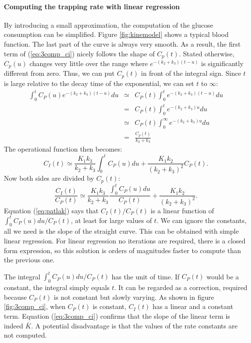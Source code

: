 \paragraph{Computing the trapping rate with linear regression\\}
By introducing a small approximation, the computation of the glucose
consumption can be simplified. Figure \ref{fig:kinemodel} shows a typical
blood function. The last part of the curve is always very smooth. As a result,
the first term of (\ref{eq:3comp_ci}) nicely follows the shape of
$C_p(t)$. Stated otherwise, $C_p(u)$ changes very little over the range where
$e^{-(k_2 + k_3)(t - u)}$ is significantly different from zero. Thus, we can
put $C_p(t)$ in front of the integral sign. Since $t$ is large relative to the
decay time of the exponential, we can set $t$ to $\infty$:
\begin{align}
\int_0^t C_P(u) e^{-(k_2 + k_3)(t - u)}du
  & \simeq &  C_P(t) \int_0^t  e^{-(k_2 + k_3)(t - u)}du\\
  & =      &  C_P(t) \int_0^t  e^{-(k_2 + k_3)u}du\\
  & \simeq &  C_P(t) \int_0^\infty  e^{-(k_2 + k_3)u}du\\
  & = & \frac{C_p(t)}{k_2 + k_3}
\end{align}
The operational function then becomes:
\begin{equation}
  C_I(t) \simeq \frac{K_1 k_3}{k_2 + k_3} \int_0^t C_P(u) du + 
  \frac{K_1 k_2}{(k_2 + k_3)^2} C_P(t).
\end{equation}
Now both sides are divided by $C_p(t)$:
\begin{equation}
  \frac{C_I(t)}{C_P(t)} \simeq 
    \frac{K_1 k_3}{k_2 + k_3} \frac{\int_0^t C_P(u) du}{C_P(t)} + 
  \frac{K_1 k_2}{(k_2 + k_3)^2}. \label{eq:patlak}
\end{equation}
Equation (\ref{eq:patlak}) says that $C_I(t)/C_P(t)$ is a linear function of
$\int_0^t C_P(u) du / C_P(t)$, at least for large values of $t$. We can ignore
the constants, all we need is the slope of the straight curve. This can be
obtained with simple linear regression. For linear regression no iterations
are required, there is a closed form expression, so this solution is orders of
magnitudes faster to compute than the previous one. 

The integral $\int_0^t C_P(u) du / C_P(t)$ has the unit of time. If $C_P(t)$
would be a constant, the integral simply equals $t$. It can be regarded as a
correction, required because $C_P(t)$ is not constant but slowly varying. As
shown in figure \ref{fig:3comp_ci}, when $C_P(t)$ is constant, $C_I(t)$ has
a linear and a constant term. Equation (\ref{eq:3comp_ci}) confirms that the
slope of the linear term is indeed $\bar{K}$. A potential disadvantage is that
the values of the rate constants are not computed.


